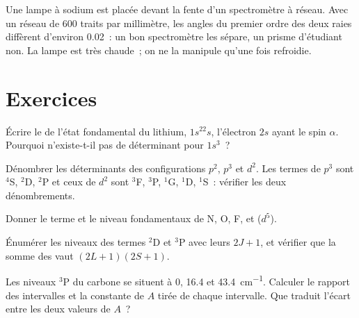 \begin{inthelab}
Une lampe à sodium est placée devant la fente d'un spectromètre à réseau.
Avec un réseau de 600 traits par millimètre, les angles du premier ordre
des deux raies diffèrent d'environ \num{0.02}\textdegree~: un bon
spectromètre les sépare, un prisme d'étudiant non. La lampe est très
chaude~; on ne la manipule qu'une fois refroidie.
\end{inthelab}

\section{Exercices}

\begin{exercise}[$\star$]\label{exo:b3:many-electron-atoms:1}
Écrire le  de l'état fondamental du lithium,
$1s^22s$, l'électron $2s$ ayant le spin $\alpha$. Pourquoi n'existe-t-il
pas de déterminant pour
$1s^3$~?
\end{exercise}

\begin{exercise}[$\star$]\label{exo:b3:many-electron-atoms:2}
Dénombrer les déterminants des configurations $p^2$, $p^3$ et $d^2$. Les
termes de $p^3$ sont ${}^4$S, ${}^2$D, ${}^2$P et ceux de $d^2$ sont ${}^3$F, ${}^3$P, ${}^1$G,
${}^1$D, ${}^1$S~: vérifier les deux dénombrements.
\end{exercise}

\begin{exercise}[$\star$]\label{exo:b3:many-electron-atoms:3}
Donner le terme et le niveau fondamentaux de N, O, F,  et  ($d^5$).
\end{exercise}

\begin{exercise}[$\star$]\label{exo:b3:many-electron-atoms:4}
Énumérer les niveaux des termes ${}^2$D et ${}^3$P avec leurs
 $2J+1$, et vérifier que la somme des  vaut
$(2L+1)(2S+1)$.
\end{exercise}

\begin{exercise}[$\star\star$]\label{exo:b3:many-electron-atoms:5}
Les niveaux ${}^3$P du carbone se situent à 0, 16.4 et
\qty{43.4}{cm^{-1}}. Calculer le rapport des intervalles et la constante
de  $A$ tirée de chaque intervalle. Que traduit
l'écart entre les deux valeurs de $A$~?
\end{exercise}

